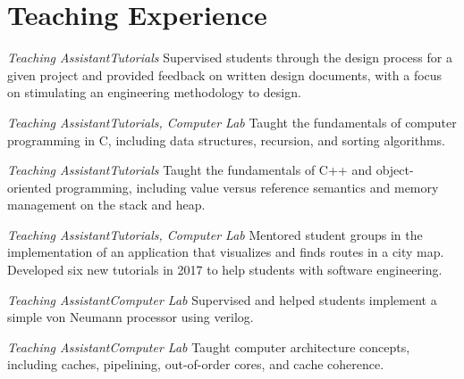 \section{\sc Teaching Experience}

{\textit{Teaching Assistant}}{\textit{Tutorials}}
{
  Supervised students through the design process for a given project and provided feedback on written design documents, with a focus on stimulating an engineering methodology to design.
}

{\textit{Teaching Assistant}}{\textit{Tutorials, Computer Lab}}
{
  Taught the fundamentals of computer programming in C, including data structures, recursion, and sorting algorithms.
}

{\textit{Teaching Assistant}}{\textit{Tutorials}}
{
  Taught the fundamentals of C++ and object-oriented programming, including value versus reference semantics and memory management on the stack and heap.
}


{\textit{Teaching Assistant}}{\textit{Tutorials, Computer Lab}}
{
  Mentored student groups in the implementation of an application that visualizes and finds routes in a city map.
  Developed six new tutorials in 2017 to help students with software engineering.
}

{\textit{Teaching Assistant}}{\textit{Computer Lab}}
{
  Supervised and helped students implement a simple von Neumann processor using verilog.
}

{\textit{Teaching Assistant}}{\textit{Computer Lab}}
{
  Taught computer architecture concepts, including caches, pipelining, out-of-order cores, and cache coherence.
}
